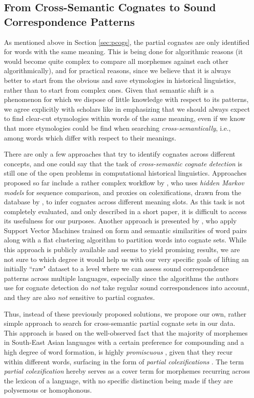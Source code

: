 \documentclass[xetex,svgnames]{scrartcl}
\begin{document}
\subsection{From Cross-Semantic Cognates to Sound Correspondence Patterns}
As mentioned above in Section \ref{sec:pcogs}, the partial cognates are only identified for words
with the same meaning. This is being done for algorithmic reasons (it would become quite complex to
compare all morphemes against each other algorithmically), and for practical reasons, since we
believe that it is always better to start from the obvious and save etymologies in historical
linguistics, rather than to start from complex ones. Given that semantic shift is a phenomenon for
which we dispose of little knowledge with respect to its patterns, we agree explicitly with scholars
like \citet{Dybo2008} in emphasizing that we should always expect to find clear-cut etymologies
within words of the same meaning, even if we know that more etymologies could be find when searching
\emph{cross-semantically}, i.e., among words which differ with respect to their meanings.
 
There are only a few approaches that try to identify cognates across different concepts, and one
could say that the task of \emph{cross-semantic cognate detection} is still one of the open problems
in computational historical linguistics. Approaches proposed so far include a rather complex
workflow by \citet{Wahle2016}, who uses \emph{hidden Markov models} for sequence comparison, and
proxies on colexifications, drawn from the database by \citet{Dellert2017}, to infer cognates across
different meaning slots. As this task is not completely evaluated, and only described in a short
paper, it is difficult to access its usefulness for our purposes. Another approach is presented by
\citet{Arnaud2017}, who apply Support Vector Machines trained on form and semantic similarities of
word pairs along with a flat clustering algorithm to partition words into cognate sets. 
While this approach is publicly available and seems to yield promising results, we are not sure to
which degree it would help us with our very specific goals of lifting an initially ``raw" dataset
to a level where we can assess sound correspondence patterns across multiple languages, especially
since the algorithms the authors use for cognate detection do \emph{not} take regular sound
correspondences into account, and they are also \emph{not} sensitive to partial cognates.
 
Thus, instead of these previously proposed solutions, we propose our own, rather simple approach to
search for cross-semantic partial cognate sets in our data. This approach is based on the
well-observed fact that the majority of morphemes in South-East Asian languages with a certain
preference for compounding and a high degree of word formation, is highly \emph{promiscuous}
\citep[8f]{List2016h}, given
that they recur within different words, surfacing in the form of \emph{partial colexifications}
\citep[62]{Hill2017a}. The term \emph{partial colexification} hereby serves as a cover term for
morphemes recurring across the lexicon of a language, with no specific distinction being made if
they are polysemous or homophonous. 
 
\end{document}
